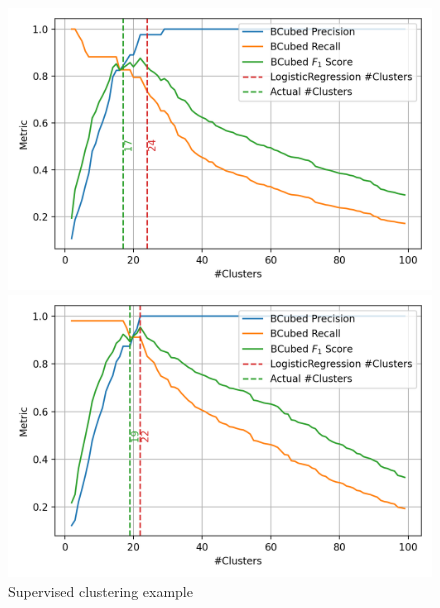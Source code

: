 \begin{figure}
  \caption{Supervised clustering example}
  \label{fig:supervised_clustering_sj}

  \label{fig:supervised_clustering_testing_st_jean_A_with_st_jean_A}
  \includegraphics[width=\linewidth]{img/supervised_clustering_testing_st_jean_A_with_st_jean_A.png}

  \label{fig:supervised_clustering_testing_st_jean_B_with_st_jean_A}
  \includegraphics[width=\linewidth]{img/supervised_clustering_testing_st_jean_B_with_st_jean_A.png}
\end{figure}

